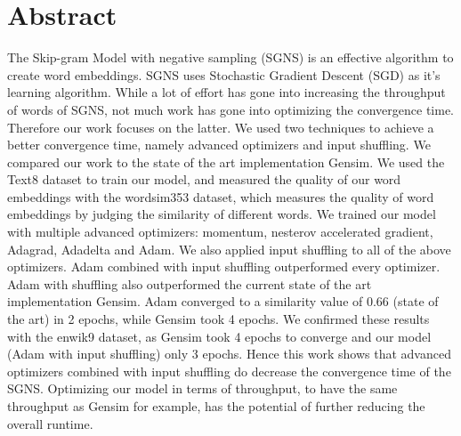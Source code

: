 \chapter*{Abstract}
The Skip-gram Model with negative sampling (SGNS) is an effective algorithm to create word embeddings. SGNS  uses Stochastic Gradient Descent (SGD) as it's learning algorithm. While a lot of effort has gone into increasing the throughput of words of SGNS, not much work has gone into optimizing the convergence time. Therefore our work focuses on the latter. We used two techniques to achieve a better convergence time, namely advanced optimizers and input shuffling. We compared our work to the state of the art implementation Gensim. We used the Text8 dataset to train our model, and measured the quality of our word embeddings with the wordsim353 dataset, which measures the quality of word embeddings by judging the similarity of different words. We trained our model with multiple advanced optimizers: momentum, nesterov accelerated gradient, Adagrad, Adadelta and Adam. We also applied input shuffling to all of the above optimizers. Adam combined with input shuffling outperformed every optimizer. Adam with shuffling also outperformed the current state of the art implementation Gensim. Adam converged to a similarity value of 0.66 (state of the art) in 2 epochs, while Gensim took 4 epochs. We confirmed these results with the enwik9 dataset, as Gensim took 4 epochs to converge and our model (Adam with input shuffling) only 3 epochs. Hence this work shows that advanced optimizers combined with input shuffling do decrease the convergence time of the SGNS. Optimizing our model in terms of throughput, to have the same throughput as Gensim for example, has the potential of further reducing the overall runtime.

